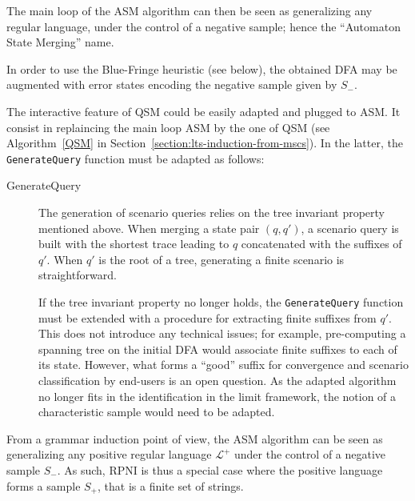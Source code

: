 The main loop of the ASM algorithm can then be seen as generalizing any regular language, under the control of a negative sample; hence the ``Automaton State Merging'' name. 

In order to use the Blue-Fringe heuristic (see below), the obtained DFA may be augmented with error states encoding the negative sample given by $S_-$. 

The interactive feature of QSM could be easily adapted and plugged to ASM. It consist in replaincing the main loop ASM by the one of QSM (see Algorithm~\ref{QSM} in Section~\ref{section:lts-induction-from-mscs}). In the latter, the \texttt{GenerateQuery} function must be adapted as follows:

\begin{description}

\item[GenerateQuery] The generation of scenario queries relies on the tree invariant property mentioned above. When merging a state pair $(q,q')$, a scenario query is built with the shortest trace leading to $q$ concatenated with the suffixes of $q'$. When $q'$ is the root of a tree, generating a finite scenario is straightforward.

If the tree invariant property no longer holds, the \texttt{GenerateQuery} function must be extended with a procedure for extracting finite suffixes from $q'$. This does not introduce any technical issues; for example, pre-computing a spanning tree on the initial DFA would associate finite suffixes to each of its state. However, what forms a ``good'' suffix for convergence and scenario classification by end-users is an open question. As the adapted algorithm no longer fits in the identification in the limit framework, the notion of a characteristic sample would need to be adapted. 

\end{description}


From a grammar induction point of view, the ASM algorithm can be seen as generalizing any positive regular language $\mathcal{L}^+$ under the control of a negative sample $S_-$. As such, RPNI is thus a special case where the positive language forms a sample $S_+$, that is a finite set of strings.

